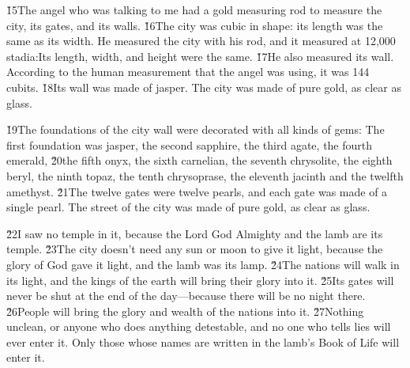 \v{15}The angel who was talking to me had a gold measuring rod to measure the city, its gates, and its walls. \v{16}The city was cubic in shape: its length was the same as its width. He measured the city with his rod, and it measured at 12,000 stadia:Its length, width, and height were the same. \v{17}He also measured its wall. According to the human measurement that the angel was using, it was 144 cubits. \v{18}Its wall was made of jasper. The city was made of pure gold, as clear as glass.

\v{19}The foundations of the city wall were decorated with all kinds of gems: The first foundation was jasper, the second sapphire, the third agate, the fourth emerald, \v{20}the fifth onyx, the sixth carnelian, the seventh chrysolite, the eighth beryl, the ninth topaz, the tenth chrysoprase, the eleventh jacinth and the twelfth amethyst. \v{21}The twelve gates were twelve pearls, and each gate was made of a single pearl. The street of the city was made of pure gold, as clear as glass.

\v{22}I saw no temple in it, because the Lord God Almighty and the lamb are its temple. \v{23}The city doesn't need any sun or moon to give it light, because the glory of God gave it light, and the lamb was its lamp. \v{24}The nations will walk in its light, and the kings of the earth will bring their glory into it. \v{25}Its gates will never be shut at the end of the day---because there will be no night there. \v{26}People will bring the glory and wealth of the nations into it. \v{27}Nothing unclean, or anyone who does anything detestable, and no one who tells lies will ever enter it. Only those whose names are written in the lamb's Book of Life will enter it.

